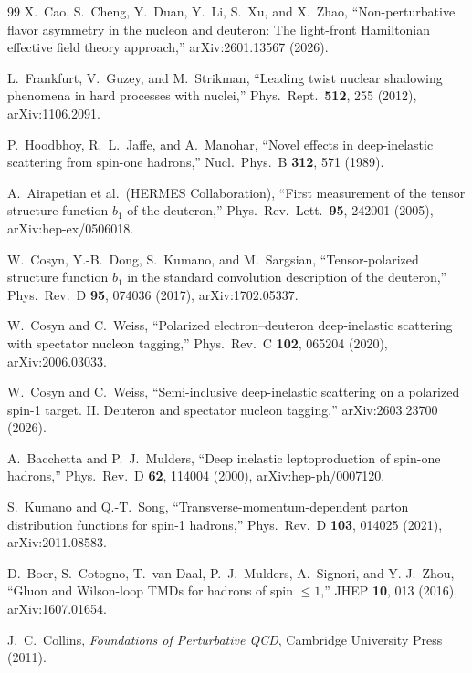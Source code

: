 \documentclass[11pt]{article}
\begin{document}
\begin{thebibliography}{99}
X.~Cao, S.~Cheng, Y.~Duan, Y.~Li, S.~Xu, and X.~Zhao,
``Non-perturbative flavor asymmetry in the nucleon and deuteron: The
light-front Hamiltonian effective field theory approach,''
arXiv:2601.13567 (2026).

L.~Frankfurt, V.~Guzey, and M.~Strikman,
``Leading twist nuclear shadowing phenomena in hard processes with nuclei,''
Phys.\ Rept.\ \textbf{512}, 255 (2012), arXiv:1106.2091.

P.~Hoodbhoy, R.~L.~Jaffe, and A.~Manohar,
``Novel effects in deep-inelastic scattering from spin-one hadrons,''
Nucl.\ Phys.\ B \textbf{312}, 571 (1989).

A.~Airapetian et al.\ (HERMES Collaboration),
``First measurement of the tensor structure function \(b_1\) of the
deuteron,''
Phys.\ Rev.\ Lett.\ \textbf{95}, 242001 (2005), arXiv:hep-ex/0506018.

W.~Cosyn, Y.-B.~Dong, S.~Kumano, and M.~Sargsian,
``Tensor-polarized structure function \(b_1\) in the standard convolution
description of the deuteron,''
Phys.\ Rev.\ D \textbf{95}, 074036 (2017), arXiv:1702.05337.

W.~Cosyn and C.~Weiss,
``Polarized electron--deuteron deep-inelastic scattering with spectator
nucleon tagging,''
Phys.\ Rev.\ C \textbf{102}, 065204 (2020), arXiv:2006.03033.

W.~Cosyn and C.~Weiss,
``Semi-inclusive deep-inelastic scattering on a polarized spin-1 target. II.
Deuteron and spectator nucleon tagging,''
arXiv:2603.23700 (2026).

A.~Bacchetta and P.~J.~Mulders,
``Deep inelastic leptoproduction of spin-one hadrons,''
Phys.\ Rev.\ D \textbf{62}, 114004 (2000), arXiv:hep-ph/0007120.

S.~Kumano and Q.-T.~Song,
``Transverse-momentum-dependent parton distribution functions for spin-1
hadrons,''
Phys.\ Rev.\ D \textbf{103}, 014025 (2021), arXiv:2011.08583.

D.~Boer, S.~Cotogno, T.~van Daal, P.~J.~Mulders, A.~Signori, and Y.-J.~Zhou,
``Gluon and Wilson-loop TMDs for hadrons of spin \(\leq1\),''
JHEP \textbf{10}, 013 (2016), arXiv:1607.01654.

J.~C.~Collins,
\emph{Foundations of Perturbative QCD},
Cambridge University Press (2011).

\end{thebibliography}
\end{document}
